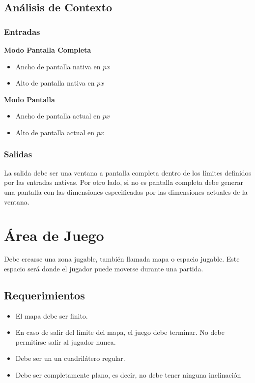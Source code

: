 \documentclass[letterpaper]{scrreprt}
\begin{document}
\subsection{Análisis de Contexto}
\subsubsection{Entradas}
\textbf{Modo Pantalla Completa}
\begin{itemize}
	\item Ancho de pantalla nativa en $px$
	\item Alto de pantalla nativa en $px$
\end{itemize}
\textbf{Modo Pantalla}
\begin{itemize}
	\item Ancho de pantalla actual en $px$
	\item Alto de pantalla actual en $px$
\end{itemize}
\subsubsection{Salidas}
La salida debe ser una ventana a pantalla completa dentro de los límites definidos por las entradas nativas. Por otro lado, si no es pantalla completa debe generar una pantalla con las dimensiones especificadas por las dimensiones actuales de la ventana.


\section{Área de Juego}
Debe crearse una zona jugable, también llamada mapa o espacio jugable. Este espacio será donde el jugador puede moverse durante una partida.

\subsection{Requerimientos}
\begin{itemize}
	\item El mapa debe ser finito.
	\item En caso de salir del límite del mapa, el juego debe terminar. No debe permitirse salir al jugador nunca.
	\item Debe ser un un cuadrilátero regular.
	\item Debe ser completamente plano, es decir, no debe tener ninguna inclinación
\end{itemize}
\end{document}
